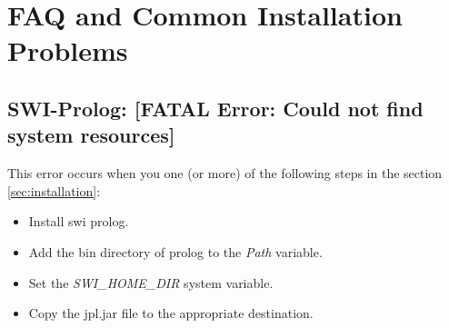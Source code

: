 ﻿\section{FAQ and Common Installation Problems}
\label{sec:faq}

\begin{comment} 

Erro de quando se abre um modelo sem ter executado a transformacao antes. Os
 ficheiros ainda n tao carregados na plataforma\ldots
 
 Solucao: adicionar atributo no modelo (nao viavel). Outra: Correr simplesmente
 a transformacao

Erro de inicializacao de prolog e isso
	Solucao: rever as path variables e copiar o jpl.jar pra lib do java. Verificar
	tbm se a versao usada do java eh a correcta.





\end{comment}

\subsection{SWI-Prolog: [FATAL Error: Could not find system resources]}

This error occurs when you one (or more) of the following steps in the section \ref{sec:installation}:
\begin{itemize}
\item Install swi prolog.
\item Add the bin directory of prolog to the \emph{Path} variable.
\item Set the \emph{SWI\_HOME\_DIR} system variable.
\item Copy the jpl.jar file to the appropriate destination.
\end{itemize}

